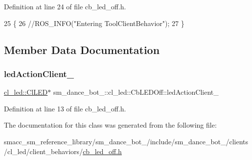 Definition at line 24 of file cb\+\_\+led\+\_\+off.\+h.


\begin{DoxyCode}
25   \{
26     \textcolor{comment}{//ROS\_INFO("Entering ToolClientBehavior");}
27   \}
\end{DoxyCode}


\subsection{Member Data Documentation}
\mbox{\label{classsm__dance__bot__2_1_1cl__led_1_1CbLEDOff_a569146280ebdd71aa5b8f3268eb028bc}} 
\subsubsection{\texorpdfstring{led\+Action\+Client\+\_\+}{ledActionClient\_}}
{\footnotesize\ttfamily \hyperlink{classsm__dance__bot__2_1_1cl__led_1_1ClLED}{cl\+\_\+led\+::\+Cl\+L\+ED}$\ast$ sm\+\_\+dance\+\_\+bot\+\_\+::cl\+\_\+led\+::\+Cb\+L\+E\+D\+Off\+::led\+Action\+Client\+\_\+}



Definition at line 13 of file cb\+\_\+led\+\_\+off.\+h.



The documentation for this class was generated from the following file\+:\begin{DoxyCompactItemize}
\item 
smacc\+\_\+sm\+\_\+reference\+\_\+library/sm\+\_\+dance\+\_\+bot\+\_/include/sm\+\_\+dance\+\_\+bot\+\_/clients/cl\+\_\+led/client\+\_\+behaviors/\hyperlink{sm__dance__bot__2_2include_2sm__dance__bot__2_2clients_2cl__led_2client__behaviors_2cb__led__off_8h}{cb\+\_\+led\+\_\+off.\+h}\end{DoxyCompactItemize}

